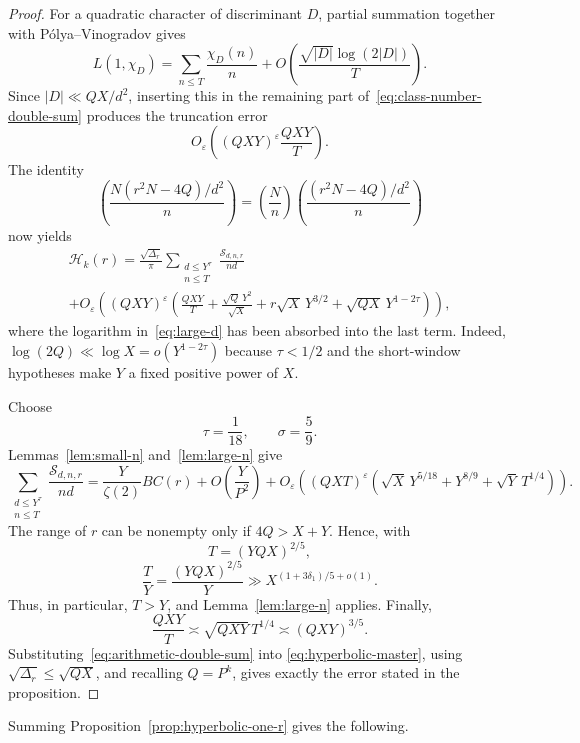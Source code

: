 \documentclass[12pt,reqno]{amsart}
\numberwithin{equation}{section}
\theoremstyle{plain}
\theoremstyle{definition}
\theoremstyle{remark}
\begin{document}
\begin{proof}
For a quadratic character of discriminant $D$, partial summation together with P\'olya--Vinogradov gives
\[
L(1,\chi_D)
=
\sum_{n\leq T}\frac{\chi_D(n)}n
+
O\left(\frac{\sqrt{|D|}\log(2|D|)}T\right).
\]
Since $|D|\ll QX/d^2$, inserting this in the remaining part of~\eqref{eq:class-number-double-sum} produces the truncation error
\begin{equation}\label{eq:L-truncation-error}
O_\varepsilon\left(
(QXY)^\varepsilon\frac{QXY}{T}
\right).
\end{equation}
The identity
\[
\left(\frac{N(r^2N-4Q)/d^2}{n}\right)
=
\left(\frac Nn\right)
\left(\frac{(r^2N-4Q)/d^2}{n}\right)
\]
now yields
\begin{multline}\label{eq:hyperbolic-master}
\mathcal H_k(r)
=
\frac{\sqrt{\Delta_r}}{\pi}
\sum_{\substack{d\leq Y^\tau\\n\leq T}}
\frac{\mathcal S_{d,n,r}}{nd}
\\
+
O_\varepsilon\left(
(QXY)^\varepsilon
\left(
\frac{QXY}{T}
+\frac{\sqrt Q\,Y^2}{\sqrt X}
+r\sqrt X\,Y^{3/2}
+\sqrt{QX}\,Y^{1-2\tau}
\right)
\right),
\end{multline}
where the logarithm in~\eqref{eq:large-d} has been absorbed into the last term.
Indeed, $\log(2Q)\ll\log X=o(Y^{1-2\tau})$ because $\tau<1/2$ and the short-window hypotheses make $Y$ a fixed positive power of $X$.

Choose
\[
\tau=\frac1{18},
\qquad
\sigma=\frac59.
\]
Lemmas~\ref{lem:small-n} and~\ref{lem:large-n} give
\begin{equation}\label{eq:arithmetic-double-sum}
\sum_{\substack{d\leq Y^\tau\\n\leq T}}
\frac{\mathcal S_{d,n,r}}{nd}
=
\frac{Y}{\zeta(2)}BC(r)
+
O\left(\frac{Y}{P^2}\right)
+
O_\varepsilon\left(
(QXT)^\varepsilon
\left(
\sqrt X\,Y^{5/18}
+Y^{8/9}
+\sqrt Y\,T^{1/4}
\right)
\right).
\end{equation}
The range of $r$ can be nonempty only if $4Q>X+Y$.
Hence, with
\[
T=(YQX)^{2/5},
\]
\[
\frac TY
=
\frac{(YQX)^{2/5}}Y
\gg X^{(1+3\delta_1)/5+o(1)}.
\]
Thus, in particular, $T>Y$, and Lemma~\ref{lem:large-n} applies.
Finally,
\[
\frac{QXY}{T}
\asymp
\sqrt{QXY}\,T^{1/4}
\asymp
(QXY)^{3/5}.
\]
Substituting~\eqref{eq:arithmetic-double-sum} into \eqref{eq:hyperbolic-master}, using $\sqrt{\Delta_r}\leq\sqrt{QX}$, and recalling $Q=P^k$, gives exactly the error stated in the
proposition.
\end{proof}

Summing Proposition~\ref{prop:hyperbolic-one-r} gives the following.
\end{document}
